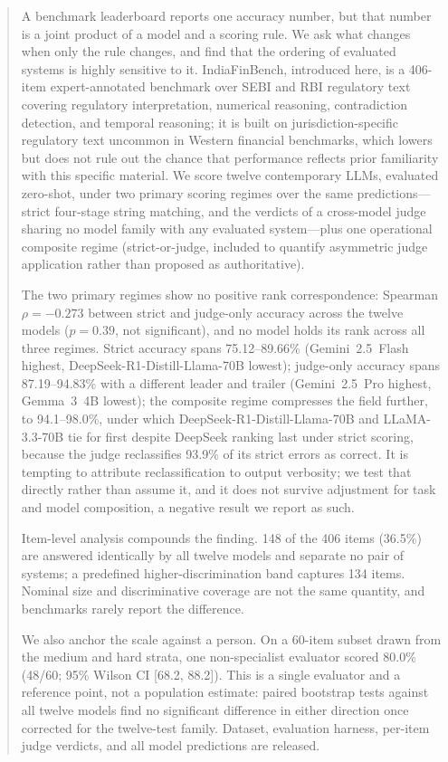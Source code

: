 \begin{abstract}
A benchmark leaderboard reports one accuracy number, but that number is a joint product of a model
and a scoring rule. We ask what changes when only the rule changes, and find that the ordering of
evaluated systems is highly sensitive to it. IndiaFinBench, introduced here, is a 406-item
expert-annotated benchmark over SEBI and RBI regulatory text covering regulatory interpretation,
numerical reasoning, contradiction detection, and temporal reasoning; it is built on
jurisdiction-specific regulatory text uncommon in Western financial benchmarks, which lowers but
does not rule out the chance that performance reflects prior familiarity with this specific material.
We score twelve contemporary LLMs, evaluated zero-shot, under two primary scoring regimes over the
same predictions---strict four-stage string matching, and the verdicts of a cross-model judge
sharing no model family with any evaluated system---plus one operational composite regime
(strict-or-judge, included to quantify asymmetric judge application rather than proposed as
authoritative).

The two primary regimes show no positive rank correspondence: Spearman $\rho = -0.273$
between strict and judge-only accuracy across the twelve models ($p = 0.39$, not significant), and no model holds
its rank across all three regimes. Strict accuracy spans 75.12--89.66\% (Gemini~2.5~Flash highest,
DeepSeek-R1-Distill-Llama-70B lowest); judge-only accuracy spans 87.19--94.83\% with a different
leader and trailer (Gemini~2.5~Pro highest, Gemma~3~4B lowest); the composite regime compresses
the field further, to 94.1--98.0\%, under which DeepSeek-R1-Distill-Llama-70B and LLaMA-3.3-70B tie
for first despite DeepSeek ranking last under strict scoring, because the judge reclassifies 93.9\%
of its strict errors as correct. It is tempting to attribute reclassification to output verbosity;
we test that directly rather than assume it, and it does not survive adjustment for task and model
composition, a negative result we report as such.

Item-level analysis compounds the finding. 148 of the 406 items (36.5\%) are answered identically by
all twelve models and separate no pair of systems; a predefined higher-discrimination band captures
134 items. Nominal size and discriminative coverage are not the same quantity, and benchmarks rarely
report the difference.

We also anchor the scale against a person. On a 60-item subset drawn from the medium and hard
strata, one non-specialist evaluator scored 80.0\% (48/60; 95\% Wilson CI [68.2, 88.2]). This is a
single evaluator and a reference point, not a population estimate: paired bootstrap tests against
all twelve models find no significant difference in either direction once corrected for the
twelve-test family. Dataset, evaluation harness, per-item judge verdicts,
and all model predictions are released.
\end{abstract}
